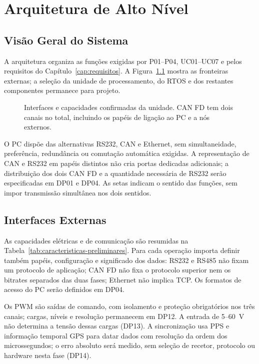 \chapter{Arquitetura de Alto Nível}
\label{cap:arquitectura}

\section{Visão Geral do Sistema}

A arquitetura organiza as funções exigidas por P01--P04, UC01--UC07 e
pelos requisitos do Capítulo~\ref{cap:requisitos}. A
Figura~\ref{fig:gateway-caixa-preta} mostra as fronteiras externas;
a seleção da unidade de processamento, do RTOS e dos restantes
componentes permanece para projeto.

\begin{figure}[htbp]
    \centering
    \caption[Interfaces e capacidades da unidade.]{Interfaces e capacidades confirmadas da unidade. CAN FD tem dois canais no total, incluindo os papéis de ligação ao PC e a nós externos.}
    \label{fig:gateway-caixa-preta}
\end{figure}

O PC dispõe das alternativas RS232, CAN e Ethernet, sem simultaneidade,
preferência, redundância ou comutação automática exigidas. A representação
de CAN e RS232 em papéis distintos não cria portas dedicadas adicionais;
a distribuição dos dois CAN FD e a quantidade necessária de RS232 serão
especificadas em DP01 e DP04. As setas indicam o sentido das funções,
sem impor transmissão simultânea nos dois sentidos.

\section{Interfaces Externas}

As capacidades elétricas e de comunicação são resumidas na
Tabela~\ref{tab:caracteristicas-preliminares}. Para cada operação importa
definir também papéis, configuração e significado dos dados: RS232 e
RS485 não fixam um protocolo de aplicação; CAN FD não fixa o protocolo
superior nem os bitrates separados das duas fases; Ethernet não implica
TCP. Os formatos de acesso do PC serão definidos em DP04.

Os PWM são saídas de comando, com isolamento e proteção obrigatórios nos três canais;
cargas, níveis e resolução permanecem em DP12. A entrada de 5--60~V
não determina a tensão dessas cargas (DP13). A sincronização usa PPS e
informação temporal GPS para datar dados com resolução da ordem dos
microssegundos; o erro absoluto será medido, sem seleção de recetor,
protocolo ou hardware nesta fase (DP14).

